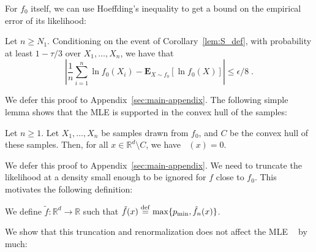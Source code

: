\documentclass[final,12pt]{colt2018}
\newcommand{\nnew}[1]{{\color{red} #1}}
\newcommand{\nnew}[1]{#1}
\newcommand{\new}[1]{{\color{red} #1}}
\newcommand{\new}[1]{{#1}}
\newtheorem{informal theorem}[theorem]{Theorem (informal statement)}
\newcommand{\eqdef}{\stackrel{{\mathrm {\footnotesize def}}}{=}}
\newcommand{\E}{\mathbf{E}}
\newcommand{\eps}{\epsilon}
\newcommand{\mle}{\mathop{\hat{f}_n}}
\newcommand{\pmin}{\mathop{p_{\mathrm{min}}}}
\begin{document}
For $f_0$ itself, we can use Hoeffding's inequality to get a bound on the empirical error of its likelihood:

\begin{lemma}\label{lem:f_0_bound}
Let $n \geq N_1$.
\new{Conditioning on the event of Corollary~\ref{lem:S_def}, with probability at least $1-\tau/3$ over $X_1, \ldots, X_n$, 
we have that}
\[
\left|\frac{1}{n} { \sum_{i=1}^n } \ln f_0(X_i) - {\E}_{X\sim f_0}\left[\ln f_0(X)\right]\right| \leq \eps/8 \;.
\]
\end{lemma}
We defer this proof to Appendix~\ref{sec:main-appendix}.
The following simple lemma shows that the MLE is supported
in the convex hull of the samples:

\begin{lemma}\label{lem:mle_support}
Let $n \geq 1$.
Let $X_1,\ldots,X_n$ be samples drawn from $f_0$, and $C$ be the convex hull of these samples.
Then, for all $x\in \mathbb{R}^d \setminus C$, we have $\mle(x)=0$.
\end{lemma}
We defer this proof to Appendix~\ref{sec:main-appendix}.
We need to truncate the likelihood at a density small enough to be ignored for $f$ close to $f_0$.
This motivates the following definition:

\begin{definition}\label{def:f_prime}
We define \nnew{$\tilde{f} : \mathbb{R}^d \rightarrow \mathbb{R}$ such that $\tilde{f}(x) \eqdef \max\{\pmin, \mle(x)\}$}.
\end{definition}

We show that this truncation and renormalization does not affect the MLE $\mle$ by much:
\end{document}

